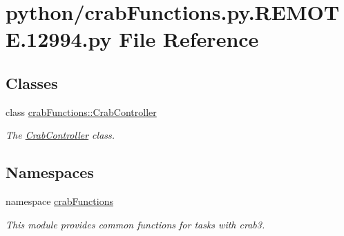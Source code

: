 \section{python/crabFunctions.py.REMOTE.12994.py File Reference}
\label{crabFunctions_8py_8REMOTE_812994_8py}
\subsection*{Classes}
\begin{DoxyCompactItemize}
\item 
class \hyperlink{classcrabFunctions_1_1CrabController}{crabFunctions::CrabController}
\begin{DoxyCompactList}\small\item\em The \hyperlink{classcrabFunctions_1_1CrabController}{CrabController} class. \item\end{DoxyCompactList}\end{DoxyCompactItemize}
\subsection*{Namespaces}
\begin{DoxyCompactItemize}
\item 
namespace \hyperlink{namespacecrabFunctions}{crabFunctions}


\begin{DoxyCompactList}\small\item\em This module provides common functions for tasks with crab3. \item\end{DoxyCompactList}\end{DoxyCompactItemize}
